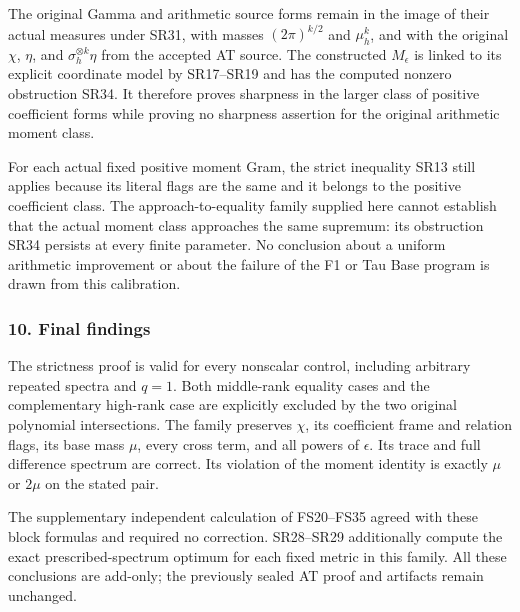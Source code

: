 The original Gamma and arithmetic source forms remain in the image of their actual measures under SR31, with masses \((2\pi)^{k/2}\) and \(\mu_h^k\), and with the original \(\chi\), \(\eta\), and \(\sigma_h^{\otimes k}\eta\) from the accepted AT source. The constructed \(M_\epsilon\) is linked to its explicit coordinate model by SR17--SR19 and has the computed nonzero obstruction SR34. It therefore proves sharpness in the larger class of positive coefficient forms while proving no sharpness assertion for the original arithmetic moment class.

For each actual fixed positive moment Gram, the strict inequality SR13 still applies because its literal flags are the same and it belongs to the positive coefficient class. The approach-to-equality family supplied here cannot establish that the actual moment class approaches the same supremum: its obstruction SR34 persists at every finite parameter. No conclusion about a uniform arithmetic improvement or about the failure of the F1 or Tau Base program is drawn from this calibration.

\subsubsection{10. Final findings}\label{endpoint-four_window_sharpness_review--final-findings}

The strictness proof is valid for every nonscalar control, including arbitrary repeated spectra and \(q=1\). Both middle-rank equality cases and the complementary high-rank case are explicitly excluded by the two original polynomial intersections. The family preserves \(\chi\), its coefficient frame and relation flags, its base mass \(\mu\), every cross term, and all powers of \(\epsilon\). Its trace and full difference spectrum are correct. Its violation of the moment identity is exactly \(\mu\) or \(2\mu\) on the stated pair.

The supplementary independent calculation of FS20--FS35 agreed with these block formulas and required no correction. SR28--SR29 additionally compute the exact prescribed-spectrum optimum for each fixed metric in this family. All these conclusions are add-only; the previously sealed AT proof and artifacts remain unchanged.
